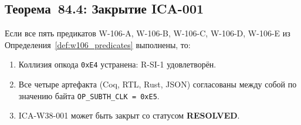 \subsection{Теорема~84.4: Закрытие ICA-001}


\begin{theorem}
\label{thm:ica_closure}
Если все пять предикатов W-106-A, W-106-B, W-106-C, W-106-D, W-106-E
из Определения~\ref{def:w106_predicates} выполнены, то:
\begin{enumerate}
  \item Коллизия опкода \texttt{0xE4} устранена: R-SI-1 удовлетворён.
  \item Все четыре артефакта (Coq, RTL, Rust, JSON) согласованы
    между собой по значению байта \texttt{OP\_SUBTH\_CLK = 0xE5}.
  \item ICA-W38-001 может быть закрыт со статусом \textbf{RESOLVED}.
\end{enumerate}
\end{theorem}

